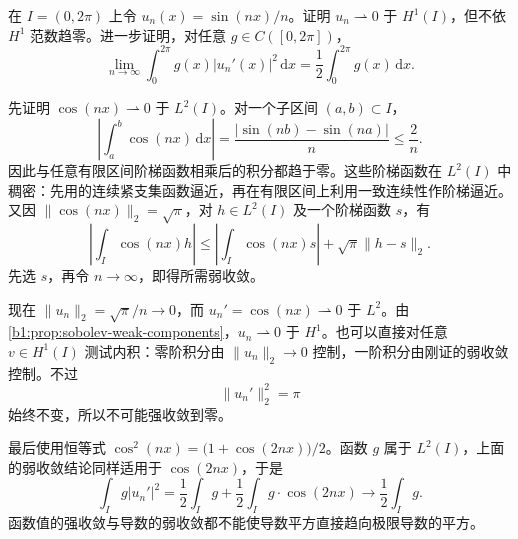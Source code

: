 \begin{exercise}\label{b1:ex:21-oscillatory-gradient-energy}
在 \(I=(0,2\pi)\) 上令 \(u_n(x)=\sin(nx)/n\)。证明 \(u_n\rightharpoonup0\) 于 \(H^1(I)\)，但不依 \(H^1\) 范数趋零。进一步证明，对任意 \(g\in C([0,2\pi])\)，
\[
 \lim_{n\to\infty}\int_0^{2\pi}g(x)|u_n'(x)|^2\,\mathrm dx
 =\frac12\int_0^{2\pi}g(x)\,\mathrm dx.
\]
\end{exercise}
\begin{solution}
先证明 \(\cos(nx)\rightharpoonup0\) 于 \(L^2(I)\)。对一个子区间 \((a,b)\subset I\)，
\[
 \left|\int_a^b\cos(nx)\,\mathrm dx\right|
 =\frac{|\sin(nb)-\sin(na)|}{n}\le\frac2n.
\]
因此与任意有限区间阶梯函数相乘后的积分都趋于零。这些阶梯函数在 \(L^2(I)\) 中稠密：先用的连续紧支集函数逼近，再在有限区间上利用一致连续性作阶梯逼近。又因 \(\|\cos(nx)\|_2=\sqrt\pi\)，对 \(h\in L^2(I)\) 及一个阶梯函数 \(s\)，有
\[
 \left|\int_I\cos(nx)h\right|
 \le\left|\int_I\cos(nx)s\right|
     +\sqrt\pi\|h-s\|_2.
\]
先选 \(s\)，再令 \(n\to\infty\)，即得所需弱收敛。

现在 \(\|u_n\|_2=\sqrt\pi/n\to0\)，而 \(u_n'=\cos(nx)\rightharpoonup0\) 于 \(L^2\)。由\cref{b1:prop:sobolev-weak-components}，\(u_n\rightharpoonup0\) 于 \(H^1\)。也可以直接对任意 \(v\in H^1(I)\) 测试内积：零阶积分由 \(\|u_n\|_2\to0\) 控制，一阶积分由刚证的弱收敛控制。不过
\[
 \|u_n'\|_2^2=\pi
\]
始终不变，所以不可能强收敛到零。

最后使用恒等式 \(\cos^2(nx)=\bigl(1+\cos(2nx)\bigr)/2\)。函数 \(g\) 属于 \(L^2(I)\)，上面的弱收敛结论同样适用于 \(\cos(2nx)\)，于是
\[
 \int_Ig|u_n'|^2
 =\frac12\int_Ig+\frac12\int_Ig\cdot \cos(2nx)
 \longrightarrow\frac12\int_Ig.
\]
函数值的强收敛与导数的弱收敛都不能使导数平方直接趋向极限导数的平方。
\end{solution}

